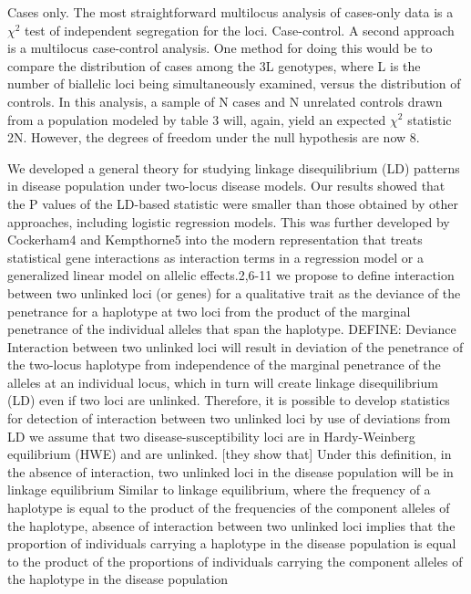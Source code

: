 Cases only. The most straightforward multilocus analysis of cases-only data is a $\chi^2$ test of independent segregation for the loci.  \cite{culverhouse2002perspective}
Case-control. A second approach is a multilocus case-control analysis. One method for doing this would be to compare the distribution of cases among the 3L genotypes, where L is the number of biallelic loci being simultaneously examined, versus the distribution of controls. In this analysis, a sample of N cases and N unrelated controls drawn from a population modeled by table 3 will, again, yield an expected $\chi^2$ statistic 2N. However, the degrees of freedom under the null hypothesis are now 8. \cite{culverhouse2002perspective}

We developed a general theory for studying linkage disequilibrium (LD) patterns in disease population under two-locus disease models.  \cite{zhao2006test}
Our results showed that the P values of the LD-based statistic were smaller than those obtained by other approaches, including logistic regression models. \cite{zhao2006test}
This was further developed by Cockerham4 and Kempthorne5 into the modern representation that treats statistical gene interactions as interaction terms in a regression model or a generalized linear model on allelic effects.2,6-11 \cite{zhao2006test}
we propose to define interaction between two unlinked loci (or genes) for a qualitative trait as the deviance of the penetrance for a haplotype at two loci from the product of the marginal penetrance of the individual alleles that span the haplotype.  \cite{zhao2006test}
DEFINE: Deviance \cite{zhao2006test}
Interaction between two unlinked loci will result in deviation of the penetrance of the two-locus haplotype from independence of the marginal penetrance of the alleles at an individual locus, which in turn will create linkage disequilibrium (LD) even if two loci are unlinked.  \cite{zhao2006test}
Therefore, it is possible to develop statistics for detection of interaction between two unlinked loci by use of deviations from LD \cite{zhao2006test}
we assume that two disease-susceptibility loci are in Hardy-Weinberg equilibrium (HWE) and are unlinked.  \cite{zhao2006test}
[they show that] Under this definition, in the absence of interaction, two unlinked loci in the disease population will be in linkage equilibrium \cite{zhao2006test}
Similar to linkage equilibrium, where the frequency of a haplotype is equal to the product of the frequencies of the component alleles of the haplotype, absence of interaction between two unlinked loci implies that the proportion of individuals carrying a haplotype in the disease population is equal to the product of the proportions of individuals carrying the component alleles of the haplotype in the disease population \cite{zhao2006test}
